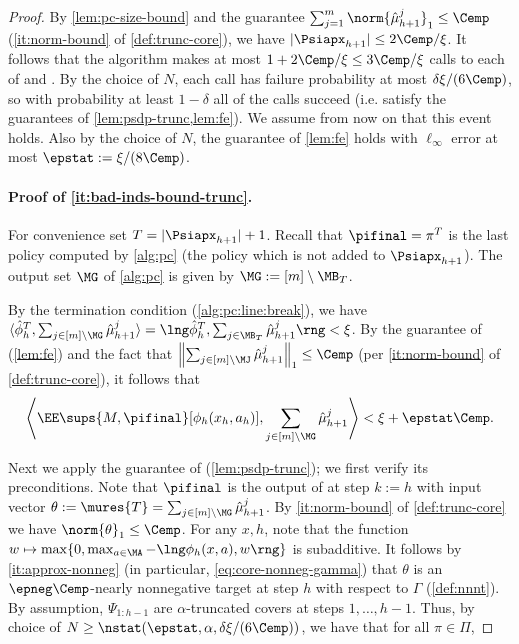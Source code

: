 \documentclass[11pt, oneside]{article}
\theoremstyle{plain}
\theoremstyle{definition}
\numberwithin{theorem}{section}
\renewcommand{\^}[1]{^{(#1)}}
\begin{document}
\begin{proof}
 By \cref{lem:pc-size-bound} and the guarantee $\sum_{j=1}^m \norm{\hat\mu_{h+1}^j}_1 \leq \Cemp$ (\cref{it:norm-bound} of \cref{def:trunc-core}), we have $|\Psiapx_{h+1}| \leq 2\Cemp/\xi$. It follows that the algorithm makes at most $1 + 2\Cemp/\xi \leq 3\Cemp/\xi$ calls to each of \PSDP and \VI. By the choice of $N$, each call has failure probability at most $\delta\xi/(6\Cemp)$, so with probability at least $1-\delta$ all of the calls succeed (i.e. satisfy the guarantees of \cref{lem:psdp-trunc,lem:fe}). We assume from now on that this event holds. Also by the choice of $N$, the guarantee of \cref{lem:fe} holds with $\ell_\infty$ error at most $\epstat := \xi/(8\Cemp)$.

\paragraph{Proof of \cref{it:bad-inds-bound-trunc}.} For convenience set $T = |\Psiapx_{h+1}|+1$. Recall that $\pifinal = \pi^T$ is the last policy computed by \cref{alg:pc} (the policy which is not added to $\Psiapx_{h+1}$). The output set $\MG$ of \cref{alg:pc} is given by $\MG := [m] \setminus \MB_T$. %

By the termination condition (\cref{alg:pc:line:break}), we have $\langle \hat \phi_h^T, \sum_{j \in [m]\setminus \MG} \hat{\mu}_{h+1}^j \rangle = \lng \hat \phi_h^T, \sum_{j \in \MB_T} \hat \mu_{h+1}^j \rng  < \xi$. By the guarantee of \FE (\cref{lem:fe}) and the fact that $\left\| \sum_{j \in [m] \backslash \MJ} \hat \mu_{h+1}^j \right\|_1 \leq \Cemp$ (per \cref{it:norm-bound} of \cref{def:trunc-core}), it follows that %
\begin{align}\label{eq:fe-piprime}\left\langle \EE\sups{M,\pifinal}[\phi_h(x_h,a_h)], \sum_{j \in [m]\setminus \MG} \hat \mu_{h+1}^j\right\rangle  < \xi + \epstat \Cemp .\end{align}

Next we apply the guarantee of \PSDP (\cref{lem:psdp-trunc}); we first verify its preconditions. Note that $\pifinal$ is the output of \PSDP at step $k:=h$ with input vector $\theta := \mures{T} = \sum_{j \in [m]\setminus \MG} \hat\mu_{h+1}^j$. By \cref{it:norm-bound} of \cref{def:trunc-core} we have $\norm{\theta}_1 \leq \Cemp$. For any $x,h$, note that the function $w \mapsto \max \{ 0, \max_{a \in \MA} - \lng \phi_h(x,a), w \rng \}$ is subadditive.  It follows by \cref{it:approx-nonneg} (in particular, \cref{eq:core-nonneg-gamma}) that $\theta$ is an $\epneg \Cemp$-nearly nonnegative target at step $h$ with respect to $\Gamma$ (\cref{def:nnnt}). By assumption, $\Psi_{1:h-1}$ are $\alpha$-truncated covers at steps $1,\dots,h-1$. Thus, by choice of $N \geq \nstat(\epstat, \alpha, \delta\xi/(6\Cemp))$, we have that for all $\pi \in \Pi$,


\end{proof}
\end{document}
